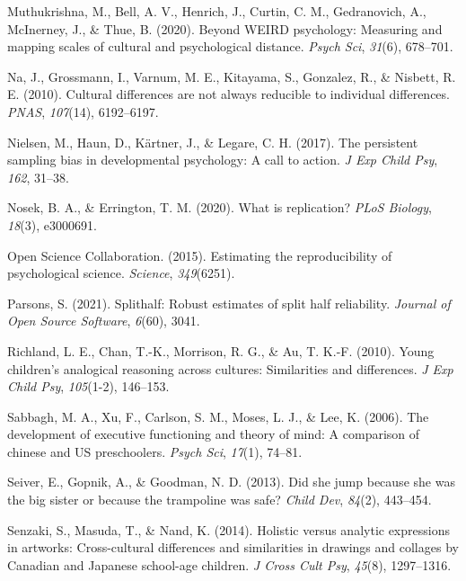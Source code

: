 \documentclass[
  man,floatsintext]{apa6}
\newlength{\cslhangindent}
\newlength{\cslentryspacingunit} %
\newenvironment{CSLReferences}[2] %
 {%
  \setlength{\parindent}{0pt}
  \ifodd #1
  \let\oldpar\par
  \def\par{\hangindent=\cslhangindent\oldpar}
  \fi
  \setlength{\parskip}{#2\cslentryspacingunit}
 }%
 {}
\begin{document}
\begin{CSLReferences}{1}{0}
\leavevmode{}%
Muthukrishna, M., Bell, A. V., Henrich, J., Curtin, C. M., Gedranovich, A., McInerney, J., \& Thue, B. (2020). Beyond WEIRD psychology: Measuring and mapping scales of cultural and psychological distance. \emph{Psych Sci}, \emph{31}(6), 678--701.

\leavevmode{}%
Na, J., Grossmann, I., Varnum, M. E., Kitayama, S., Gonzalez, R., \& Nisbett, R. E. (2010). Cultural differences are not always reducible to individual differences. \emph{PNAS}, \emph{107}(14), 6192--6197.

\leavevmode{}%
Nielsen, M., Haun, D., Kärtner, J., \& Legare, C. H. (2017). The persistent sampling bias in developmental psychology: A call to action. \emph{J Exp Child Psy}, \emph{162}, 31--38.

\leavevmode{}%
Nosek, B. A., \& Errington, T. M. (2020). What is replication? \emph{PLoS Biology}, \emph{18}(3), e3000691.

\leavevmode{}%
Open Science Collaboration. (2015). Estimating the reproducibility of psychological science. \emph{Science}, \emph{349}(6251).

\leavevmode{}%
Parsons, S. (2021). Splithalf: Robust estimates of split half reliability. \emph{Journal of Open Source Software}, \emph{6}(60), 3041.

\leavevmode{}%
Richland, L. E., Chan, T.-K., Morrison, R. G., \& Au, T. K.-F. (2010). Young children's analogical reasoning across cultures: Similarities and differences. \emph{J Exp Child Psy}, \emph{105}(1-2), 146--153.

\leavevmode{}%
Sabbagh, M. A., Xu, F., Carlson, S. M., Moses, L. J., \& Lee, K. (2006). The development of executive functioning and theory of mind: A comparison of chinese and US preschoolers. \emph{Psych Sci}, \emph{17}(1), 74--81.

\leavevmode{}%
Seiver, E., Gopnik, A., \& Goodman, N. D. (2013). Did she jump because she was the big sister or because the trampoline was safe? \emph{Child Dev}, \emph{84}(2), 443--454.

\leavevmode{}%
Senzaki, S., Masuda, T., \& Nand, K. (2014). Holistic versus analytic expressions in artworks: Cross-cultural differences and similarities in drawings and collages by {C}anadian and {J}apanese school-age children. \emph{J Cross Cult Psy}, \emph{45}(8), 1297--1316.


\end{CSLReferences}
\end{document}
